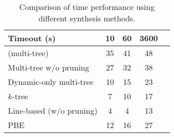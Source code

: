 
\begin{table}[t]
\setlength{\dashlinedash}{.5ex}
\setlength{\dashlinegap}{1ex}
\setlength{\tabcolsep}{2ex}
\centering
\caption{Comparison of time performance using different synthesis methods.}
\begin{tabular}{@{}lcccc@{}}
\toprule
\textbf{Timeout (s)}  & \textbf{10} & \textbf{60} & \textbf{3600} \\ \midrule
\Forest{} (multi-tree)      & 35     & 41     & 48   \\ \hdashline
Multi-tree w/o pruning      & 27     & 32     & 38   \\
Dynamic-only multi-tree     & 10     & 15     & 23   \\ \hdashline
\(k\)-tree                  & 7      & 10     & 17   \\
Line-based (w/o pruning)    & 4      & 4      & 13   \\ \hdashline
\Regel{} PBE                & 12     & 16     & 27   \\ \bottomrule
\end{tabular}
\label{table:number-solved}
\vspace*{-2mm}
\end{table}